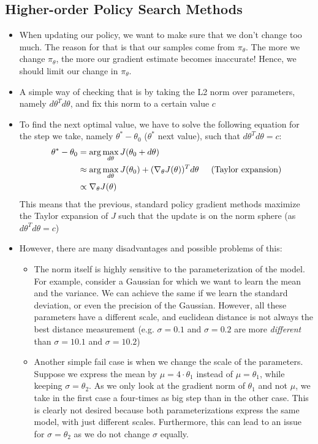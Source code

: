 \subsection{Higher-order Policy Search Methods}
\begin{itemize}
	\item When updating our policy, we want to make sure that we don't change too much. The reason for that is that our samples come from $\pi_{\theta}$. The more we change $\pi_{\theta}$, the more our gradient estimate becomes inaccurate! Hence, we should limit our change in $\pi_{\theta}$.
	\item A simple way of checking that is by taking the L2 norm over parameters, namely $d\theta^T d\theta$, and fix this norm to a certain value $c$
	\item To find the next optimal value, we have to solve the following equation for the step we take, namely $\theta^{*}-\theta_0$ ($\theta^{*}$ next value), such that $d\theta^T d\theta=c$:
	\begin{equation*}
		\begin{split}
			\theta^{*}-\theta_0 & = \arg\max_{d\theta} J(\theta_0 + d\theta)\\
			& \approx \arg\max_{d\theta} J(\theta_0) + (\nabla_{\theta} J(\theta))^T d\theta \hspace{5mm}\text{(Taylor expansion)}\\
			& \propto \nabla_{\theta} J(\theta)
		\end{split}
	\end{equation*}
	This means that the previous, standard policy gradient methods maximize the Taylor expansion of $J$ such that the update is on the norm sphere (as $d\theta^T d\theta=c$)
	\item However, there are many disadvantages and possible problems of this:
	\begin{itemize}
		\item The norm itself is highly sensitive to the parameterization of the model. For example, consider a Gaussian for which we want to learn the mean and the variance. We can achieve the same if we learn the standard deviation, or even the precision of the Gaussian. However, all these parameters have a different scale, and euclidean distance is not always the best distance measurement (e.g. $\sigma=0.1$ and $\sigma=0.2$ are more \textit{different} than $\sigma=10.1$ and $\sigma=10.2$)
		\item Another simple fail case is when we change the scale of the parameters. Suppose we express the mean by $\mu=4\cdot \theta_1$ instead of $\mu=\theta_1$, while keeping $\sigma=\theta_2$. As we only look at the gradient norm of $\theta_1$ and not $\mu$, we take in the first case a four-times as big step than in the other case. This is clearly not desired because both parameterizations express the same model, with just different scales. Furthermore, this can lead to an issue for $\sigma=\theta_2$ as we do not change $\sigma$ equally.

\end{itemize}
\end{itemize}
